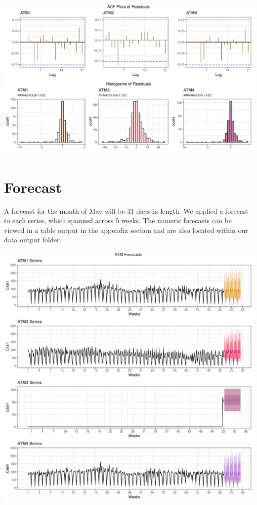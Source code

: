 \documentclass[openany]{book}
\begin{document}
\includegraphics{Group2_Project1_Fall2019_files/figure-latex/unnamed-chunk-7-1.pdf}
\includegraphics{Group2_Project1_Fall2019_files/figure-latex/unnamed-chunk-7-2.pdf}

\hypertarget{forecast}{%
\section{Forecast}\label{forecast}}

A forecast for the month of May will be 31 days in length. We applied a
forecast to each series, which spanned across 5 weeks. The numeric
forecasts can be viewed in a table output in the appendix section and
are also located within our data output folder.

\includegraphics{Group2_Project1_Fall2019_files/figure-latex/unnamed-chunk-8-1.pdf}
\end{document}

